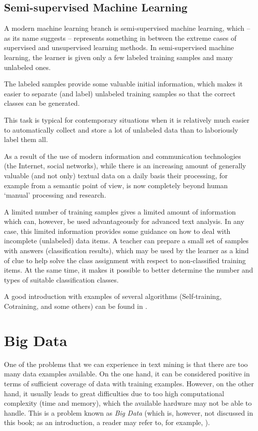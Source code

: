 \subsection{ Semi-supervised Machine Learning}

A modern machine learning branch is semi-supervised machine learning, which
– as its name suggests – represents something in between the extreme cases of supervised and unsupervised learning methods. In semi-supervised machine learning, the learner is given only a few labeled training samples and many unlabeled
ones.

The labeled samples provide some valuable initial information, which makes
it easier to separate (and label) unlabeled training samples so that the correct
classes can be generated.

This task is typical for contemporary situations when it is relatively much
easier to automatically collect and store a lot of unlabeled data than to laboriously
label them all.

As a result of the use of modern information and communication technologies
(the Internet, social networks), while there is an increasing amount of generally
valuable (and not only) textual data on a daily basis their processing, for example from a semantic point of view, is now completely beyond human ‘manual’
processing and research.

A limited number of training samples gives a limited amount of information
which can, however, be used advantageously for advanced text analysis. In any
case, this limited information provides some guidance on how to deal with incomplete (unlabeled) data items. A teacher can prepare a small set of samples
with answers (classification results), which may be used by the learner as a kind
of clue to help solve the class assignment with respect to non-classified training
items. At the same time, it makes it possible to better determine the number and
types of suitable classification classes.

A good introduction with examples of several algorithms (Self-training, Cotraining, and some others) can be found in \cite{ref1}.

\section{Big Data}

One of the problems that we can experience in text mining is that there are too
many data examples available. On the one hand, it can be considered positive
in terms of sufficient coverage of data with training examples. However, on the
other hand, it usually leads to great difficulties due to too high computational
complexity (time and memory), which the available hardware may not be able to
handle. This is a problem known as \textit{Big Data} (which is, however, not discussed
in this book; as an introduction, a reader may refer to, for example, \cite{ref147,ref152}).

